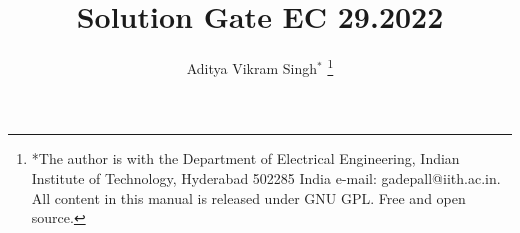 \documentclass[journal,12pt,onecolumn]{IEEEtran}
\theoremstyle{remark}
\begin{document}
%




\vspace{3cm}

\title{
Solution Gate EC 29.2022
}
\author{ Aditya Vikram Singh$^{*}$%
  \thanks{*The author is with the Department
    of Electrical Engineering, Indian Institute of Technology, Hyderabad
    502285 India e-mail:  gadepall@iith.ac.in. All content in this manual is released under GNU GPL.  Free and open   
    source.}}  


%
%
% 
%



% 
\end{document}
